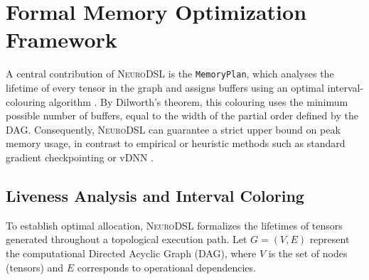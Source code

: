 \documentclass{article}
\begin{document}
\section{Formal Memory Optimization Framework}
\label{sec:memory_planning}

A central contribution of \textsc{NeuroDSL} is the \texttt{MemoryPlan}, which analyses the lifetime of every tensor in the graph and assigns buffers using an optimal interval-colouring algorithm \cite{dilworth}. By Dilworth's theorem, this colouring uses the minimum possible number of buffers, equal to the width of the partial order defined by the DAG. Consequently, \textsc{NeuroDSL} can guarantee a strict upper bound on peak memory usage, in contrast to empirical or heuristic methods such as standard gradient checkpointing \cite{checkpointing} or vDNN \cite{vdnn}.

\subsection{Liveness Analysis and Interval Coloring}
To establish optimal allocation, \textsc{NeuroDSL} formalizes the lifetimes of tensors generated throughout a topological execution path. Let $G = (V, E)$ represent the computational Directed Acyclic Graph (DAG), where $V$ is the set of nodes (tensors) and $E$ corresponds to operational dependencies.
\end{document}
